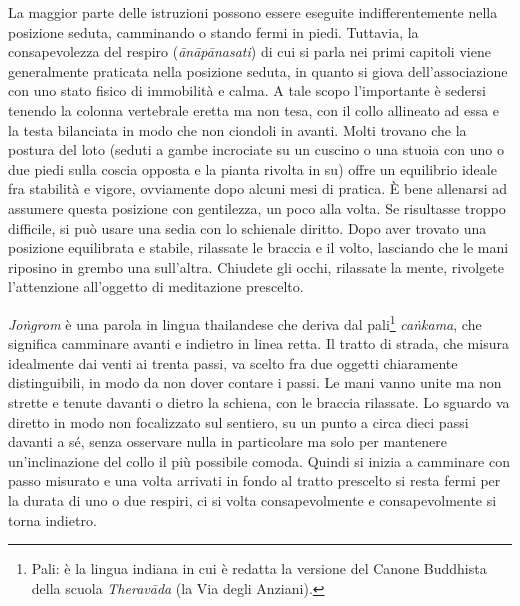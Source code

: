 
La maggior parte delle istruzioni possono essere eseguite
indifferentemente nella posizione seduta, camminando o stando fermi in
piedi. Tuttavia, la consapevolezza del respiro (\textit{ānāpānasati}) di cui si
parla nei primi capitoli viene generalmente praticata nella posizione
seduta, in quanto si giova dell'associazione con uno stato fisico di
immobilità e calma. A tale scopo l'importante è sedersi tenendo la
colonna vertebrale eretta ma non tesa, con il collo allineato ad essa e
la testa bilanciata in modo che non ciondoli in avanti. Molti trovano
che la postura del loto (seduti a gambe incrociate su un cuscino o una
stuoia con uno o due piedi sulla coscia opposta e la pianta rivolta in
su) offre un equilibrio ideale fra stabilità e vigore, ovviamente dopo
alcuni mesi di pratica. È bene allenarsi ad assumere questa posizione
con gentilezza, un poco alla volta. Se risultasse troppo difficile, si
può usare una sedia con lo schienale diritto. Dopo aver trovato una
posizione equilibrata e stabile, rilassate le braccia e il volto,
lasciando che le mani riposino in grembo una sull'altra. Chiudete gli
occhi, rilassate la mente, rivolgete l'attenzione all'oggetto di
meditazione prescelto.

\label{jongrom}
\textit{Joṅgrom} è una parola in lingua thailandese che deriva dal
pali\footnote{Pali: è la lingua indiana in cui è redatta la versione
del Canone Buddhista della scuola \textit{Theravāda} (la Via degli Anziani).}
\textit{caṅkama}, che significa camminare avanti e indietro in
linea retta. Il tratto di strada, che misura idealmente dai venti ai
trenta passi, va scelto fra due oggetti chiaramente distinguibili, in
modo da non dover contare i passi. Le mani vanno unite ma non strette e
tenute davanti o dietro la schiena, con le braccia rilassate. Lo sguardo
va diretto in modo non focalizzato sul sentiero, su un punto a circa
dieci passi davanti a sé, senza osservare nulla in particolare ma solo
per mantenere un'inclinazione del collo il più possibile comoda. Quindi
si inizia a camminare con passo misurato e una volta arrivati in fondo
al tratto prescelto si resta fermi per la durata di uno o due respiri,
ci si volta consapevolmente e consapevolmente si torna indietro.

